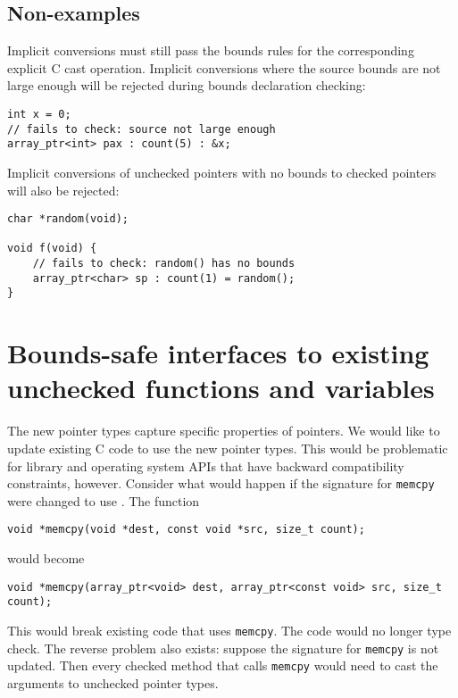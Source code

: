 \subsection{Non-examples}

Implicit conversions must still pass the bounds rules for the corresponding explicit
C cast operation.  Implicit conversions where the source bounds are not large
enough will be rejected during bounds declaration checking:
\begin{lstlisting}
int x = 0;
// fails to check: source not large enough
array_ptr<int> pax : count(5) : &x;
\end{lstlisting}

Implicit conversions of unchecked pointers with no bounds to checked pointers
will also be rejected:
\begin{lstlisting}
char *random(void);

void f(void) {
    // fails to check: random() has no bounds
    array_ptr<char> sp : count(1) = random(); 
}
\end{lstlisting}

\section{Bounds-safe interfaces to existing unchecked functions and variables}
\label{section:function-bounds-safe-interfaces}

The new pointer types capture specific properties of pointers. We would like to update
existing C code to use the new pointer types. This would be problematic for library and operating
system APIs that have backward  compatibility constraints, however.   Consider what would happen
if the signature for \texttt{memcpy} were changed to use \arrayptr. The function

\begin{lstlisting}
void *memcpy(void *dest, const void *src, size_t count);
\end{lstlisting}

would become

\begin{lstlisting}
void *memcpy(array_ptr<void> dest, array_ptr<const void> src, size_t count);
\end{lstlisting}

This would break existing code that uses \texttt{memcpy}.  The code would no
longer type check.  The reverse problem also exists: suppose the signature for
\texttt{memcpy} is not updated.  Then every checked method that calls
\texttt{memcpy} would need to cast the arguments to unchecked pointer types.

